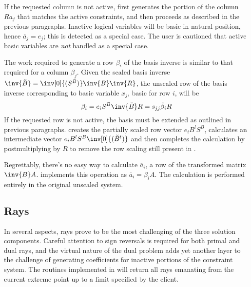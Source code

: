 If the requested column is not active, \dylp first generates the portion of the
column $R a_j$ that matches the active constraints, and then proceeds as
described in the previous paragraphs.
Inactive logical variables will be basic in natural position, hence
$\overline{a}_j = e_j$; this is detected as a special case.
The user is cautioned that active basic variables are \textit{not} handled as a
special case.


The work required to generate a row $\beta_i$ of the basis inverse is
similar to that required for a column $\beta_j$.
Given the scaled basis inverse
$\inv{\breve{B}} = \inv[0]{(S^B)}\inv{B}\inv{R}$, the unscaled row of the
basis inverse corresponding to basic variable $x_j$, basic for row $i$,
will be
\begin{equation*}
\beta_i = e_i S^B \inv{\breve{B}} R = s_{jj} \breve{\beta}_i R
\end{equation*}
If the requested row is not active, the basis must be extended as outlined in
previous paragraphs.
\Dylp creates the partially scaled row vector $e_i B^l S^B$, calculates an
intermediate vector $e_i B^l S^B \inv[0]{(\breve{B}^t)}$ and then completes the
calculation by postmultiplying by $R$ to remove the row scaling still present
in .

Regrettably, there's no easy way to calculate $\overline{a}_i$, a row of
the transformed matrix $\inv{B}A$.
\Dylp implements this operation as $\overline{a}_i = \beta_i A$.
The calculation is performed entirely in the original unscaled system.


\subsection{Rays}
\label{sec:Rays}

In several aspects, rays prove to be the most challenging of the three
solution components.
Careful attention to sign reversals is required for both primal and dual rays,
and the virtual nature of the dual problem adds yet another layer to the
challenge of generating coefficients for inactive portions of the constraint
system.
The routines implemented in \dylp will return all rays emanating from the
current extreme point up to a limit specified by the client.

